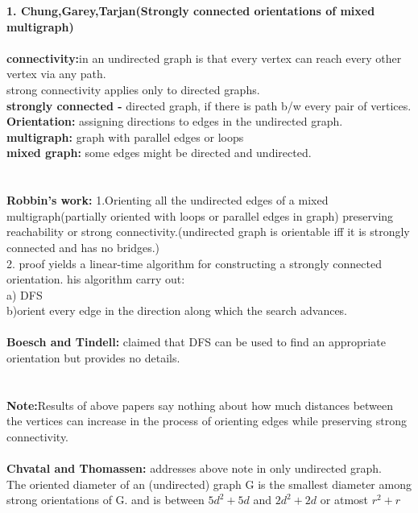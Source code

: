 \documentclass{article}
\begin{document}
{\LARGE
\textbf{1. Chung,Garey,Tarjan(Strongly connected orientations of mixed multigraph)} \\
\vspace{1cm} \\
\textbf{connectivity:}in an undirected graph is that every vertex can reach every other vertex via any path.\\
strong connectivity applies only to directed graphs.\\
\textbf{strongly connected - } directed graph, if there is path b/w every pair of vertices.\\
\textbf{Orientation:} assigning directions to edges in the undirected graph. \\
\textbf{multigraph:} graph with parallel edges or loops \\
\textbf{mixed  graph:} some edges might be directed and undirected.\\
\vspace{2cm}\\
\\\textbf{Robbin's work:} 1.Orienting all the undirected edges of a mixed multigraph(partially oriented with loops or parallel edges in graph) preserving reachability or strong connectivity.(undirected graph is orientable iff it is strongly connected and has no bridges.)\\
2. proof yields a linear-time algorithm for constructing a strongly connected orientation. his algorithm carry out:\\
a) DFS \\
b)orient every edge in the direction along which the search advances.\\
\
\vspace{1cm}\\
\textbf{Boesch and Tindell:} 
claimed that DFS can be used to find an appropriate orientation but provides no details.\\
\vspace{1cm}\\
\vspace{1cm} \\
 \textbf{Note:}Results of above papers say nothing about how much distances between the vertices can increase in the process of orienting edges while preserving strong connectivity. \\
 \vspace{1cm} \\
\textbf{Chvatal and Thomassen:} addresses above note in only undirected graph.\\
 The oriented diameter of an (undirected) graph G is the smallest diameter among strong orientations of G. and is between $5d^{2}+5d$ and $2d^{2}+2d$ or atmost $r^{2}+r$ \\
 
}
\end{document}
